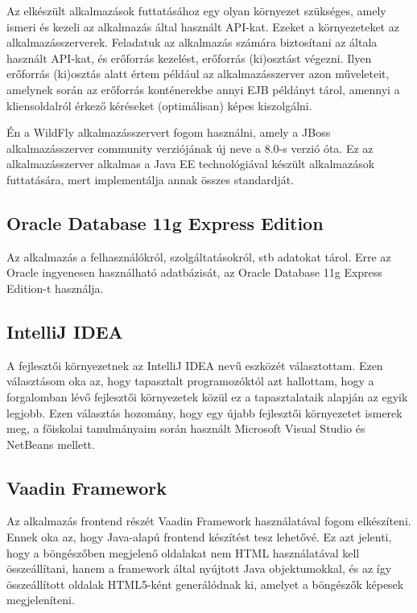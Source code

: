 \documentclass[centeredchapter]{thesis-ekf}
\theoremstyle{definition}
\theoremstyle{remark}
\begin{document}
Az elkészült alkalmazások futtatásához egy olyan környezet szükséges, amely ismeri és kezeli az alkalmazás által használt API-kat. Ezeket a környezeteket az alkalmazásszerverek. 
Feladatuk az alkalmazás számára biztosítani az általa használt API-kat, és erőforrás kezelést, erőforrás (ki)osztást végezni. Ilyen erőforrás (ki)osztás alatt értem például az alkalmazásszerver azon műveleteit, amelynek során az erőforrás konténerekbe annyi EJB példányt tárol, amennyi a kliensoldalról érkező kéréseket (optimálisan) képes kiszolgálni.

Én a WildFly alkalmazásszervert fogom használni, amely a JBoss alkalmazásszerver community verziójának új neve a 8.0-s verzió óta. Ez az alkalmazásszerver alkalmas a Java EE technológiával készült alkalmazások futtatására, mert implementálja annak összes standardját.  

\subsection{Oracle Database 11g Express Edition}

Az alkalmazás a felhasználókról, szolgáltatásokról, stb adatokat tárol. Erre az Oracle ingyenesen használható adatbázisát, az Oracle Database 11g Express Edition-t használja.
\subsection{IntelliJ IDEA}

A fejlesztői környezetnek az IntelliJ IDEA nevű eszközét választottam. Ezen választásom oka az, hogy tapasztalt programozóktól azt hallottam, hogy a forgalomban lévő fejlesztői környezetek közül ez a tapasztalataik alapján az egyik legjobb. Ezen választás hozomány, hogy egy újabb fejlesztői környezetet ismerek meg, a főiskolai tanulmányaim során használt Microsoft Visual Studio és NetBeans mellett.

\subsection{Vaadin Framework}

Az alkalmazás frontend részét Vaadin Framework használatával fogom elkészíteni. Ennek oka az, hogy Java-alapú frontend készítést tesz lehetővé. Ez azt jelenti, hogy a böngészőben megjelenő oldalakat nem HTML használatával kell összeállítani, hanem a framework által nyújtott Java objektumokkal, és az így összeállított oldalak HTML5-ként generálódnak ki, amelyet a böngészők képesek megjeleníteni.
\end{document}
